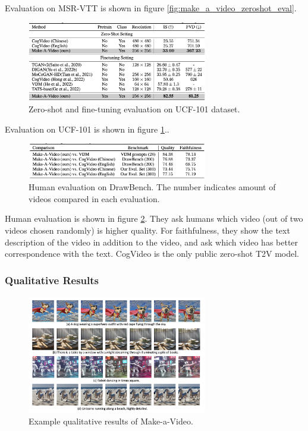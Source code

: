 Evaluation on MSR-VTT is shown in figure \ref{fig:make_a_video_zeroshot_eval}.

\begin{figure}[h]
    \centering
    \includegraphics[width=0.7\textwidth]{images/make_a_video/ucf_101.png}
    \caption{Zero-shot and fine-tuning evaluation on UCF-101 dataset.}
    \label{fig:make_a_video_ucf_101}
\end{figure}

Evaluation on UCF-101 is shown in figure \ref{fig:make_a_video_ucf_101}..

\begin{figure}[h]
    \centering
    \includegraphics[width=0.7\textwidth]{images/make_a_video/eval.png}
    \caption{Human evaluation on DrawBench. The number indicates amount of videos compared in each evaluation.}
    \label{fig:make_a_video_human_eval}
\end{figure}

Human evaluation is shown in figure \ref{fig:make_a_video_human_eval}. They ask humans which video (out of two videos chosen randomly) is higher quality. For faithfulness, they show the text description of the video in addition to the video, and ask which video has better correspondence with the text. CogVideo is the only public zero-shot T2V model.



\subsubsection{Qualitative Results}

\begin{figure}
    \centering
    \includegraphics[width=0.7\textwidth]{images/make_a_video/examples.png}
    \caption{Example qualitative results of Make-a-Video.}
    \label{fig:make_a_video_examples}
\end{figure}